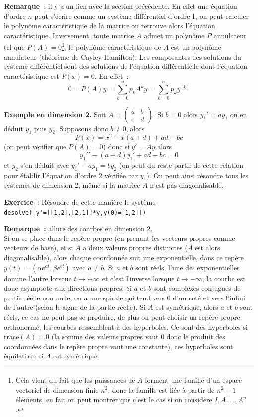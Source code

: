 \documentclass[a4paper,11pt]{article}
\begin{document}
{\bf Remarque~}: il y a un lien avec la section
pr\'ec\'edente. En effet une \'equation d'ordre $n$ peut
s'\'ecrire comme un syst\`eme diff\'erentiel d'ordre 1,
on peut calculer le polyn\^ome caract\'eristique de la matrice
on retrouve alors l'\'equation caract\'eristique. Inversement,
toute matrice $A$ admet un polyn\^ome $P$
annulateur tel que $P(A)=0$\footnote{Cela vient du fait que
les puissances de $A$ forment une famille d'un
espace vectoriel de dimension finie $n^2$, donc la famille est li\'ee
\`a partir de $n^2+1$ \'el\'ements, en fait on peut montrer
que c'est le cas si on consid\`ere $I,A,...,A^n$.},
le polyn\^ome caract\'eristique de $A$ est un polyn\^ome annulateur
(th\'eor\`eme de Cayley-Hamilton).
Les composantes des solutions du syst\`eme diff\'erentiel sont des 
solutions de l'\'equation diff\'erentielle dont l'\'equation
caract\'eristique est $P(x)=0$. En effet~:
$$0=P(A)y=\sum_{k=0}^n p_k A^k y = \sum_{k=0}^n p_k y^{[k]}$$

{\bf Exemple en dimension 2.}
Soit $A=\left(\begin{array}{cc}
a & b \\
c & d
\end{array}\right) $. Si $b=0$ alors $y_1'=ay_1$ on en d\'eduit
$y_1$ puis $y_2$. Supposons donc $b\neq 0$, alors
$$ P(x)=x^{2} - x (a+d) +a d-b c$$
(on peut v\'erifier que $P(A)=0$)
donc si $y'=Ay$ alors 
$$ y_1'{'}-(a+d)y_1'+ad-bc=0$$
et $y_2$ s'en d\'eduit avec $y_1'-ay_1=by_2$ (on peut du reste
partir de cette relation pour \'etablir l'\'equation d'ordre 2
v\'erifi\'ee par $y_1$). On peut ainsi
r\'esoudre tous les syst\`emes de dimension 2, m\^eme
si la matrice $A$ n'est pas diagonalisable.

{\bf Exercice~}: R\'esoudre de cette mani\`ere le syst\`eme\\
\verb|desolve([y'=[[1,2],[2,1]]*y,y(0)=[1,2]])|

{\bf Remarque~:} allure des courbes en dimension 2.\\
Si on se place dans le rep\`ere propre (en prenant les vecteurs
propres comme vecteurs de base), et si $A$ a deux valeurs
propres distinctes ($A$ est alors diagonalisable),
alors chaque coordonn\'ee suit une exponentielle, dans ce rep\`ere
$y(t)=(\alpha e^{at}, \beta e^{bt})$ avec $a \neq b$. Si $a$ et $b$
sont r\'eels, l'une des exponentielles domine l'autre lorsque
$t\rightarrow +\infty$ et c'est l'inverse lorsque $t\rightarrow
-\infty$, la courbe est donc asymptote aux directions propres.
Si $a$ et $b$ sont complexes conjugu\'es de partie r\'eelle non nulle, 
on a une spirale qui
tend vers 0 d'un cot\'e et vers l'infini de l'autre (selon le signe
de la partie r\'eelle). Si $A$ est
sym\'etrique, alors $a$ et $b$ sont r\'eels, ce cas ne peut
pas se produire, de plus on peut choisir un rep\`ere propre
orthonorm\'e, les courbes ressemblent \`a des hyperboles.
Ce sont des hyperboles si trace$(A)=0$ (la somme des valeurs
propres vaut 0 donc le produit des coordonn\'ees dans
le rep\`ere propre vaut une constante),
ces hyperboles sont \'equilat\`eres si $A$ est sym\'etrique.
\end{document}
